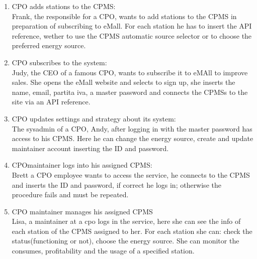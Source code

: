 \begin{enumerate}[label=\textbf{S\arabic*}]
      \item \ac{CPO} adds stations to the \ac{CPMS}:\\
            Frank, the responsible for a \ac{CPO}, wants to add stations to the \ac{CPMS} in preparation of subscribing to eMall. For each station he has to insert the \ac{API} reference,
            wether to use the \ac{CPMS} automatic source selector or to choose the preferred energy source.\label{SCE:cpo-adds-stations}
      \item \ac{CPO} subscribes to the system:\\
            Judy, the CEO of a famous \ac{CPO}, wants to subscribe it to eMAll to improve sales.
            She opens the eMall website and selects to sign up, she inserts the name, email, partita iva, a master password and connects the \acp{CPMS} to the site via an \ac{API} reference.\label{SCE:cpo-signs-up}
      \item \ac{CPO} updates settings and strategy about its system:\\
            The sysadmin of a \ac{CPO}, Andy, after logging in with the master password has access to his \ac{CPMS}.
            Here he can change the energy source, create and update maintainer account inserting the ID and password.\label{SCE:cpo-updates-settings}
      \item \ac{CPO}maintainer logs into his assigned \ac{CPMS}:\\
            Brett a \ac{CPO} employee wants to access the service, he connects to the \ac{CPMS} and inserts the ID
            and password, if correct he logs in; otherwise the procedure fails and must be repeated.\label{SCE:cpomaintainer-logs-in}
      \item \ac{CPO} maintainer manages his assigned \ac{CPMS}\\
            Lisa, a maintainer at a cpo logs in the service, here she can see the info of each station of the \ac{CPMS} assigned to her.
            For each station she can: check the status(functioning or not), choose the energy source.
            She can monitor the consumes, profitability and the usage of a specified station.\label{SCE:cpomaintainer-manages}
\end{enumerate}

